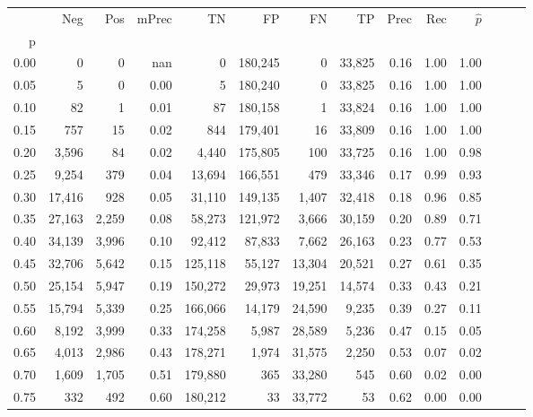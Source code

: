 \begin{tabular}{rrrrrrrrrrrrrr}
\toprule
{} &     Neg &    Pos & mPrec &       TN &       FP &      FN &      TP &  Prec &   Rec & $\hat{p}$ \\
p    &         &        &       &          &          &         &         &       &       &           \\
\midrule
0.00 &       0 &      0 &   nan &        0 &  180,245 &       0 &  33,825 &  0.16 &  1.00 &      1.00 \\
0.05 &       5 &      0 &  0.00 &        5 &  180,240 &       0 &  33,825 &  0.16 &  1.00 &      1.00 \\
0.10 &      82 &      1 &  0.01 &       87 &  180,158 &       1 &  33,824 &  0.16 &  1.00 &      1.00 \\
0.15 &     757 &     15 &  0.02 &      844 &  179,401 &      16 &  33,809 &  0.16 &  1.00 &      1.00 \\
0.20 &   3,596 &     84 &  0.02 &    4,440 &  175,805 &     100 &  33,725 &  0.16 &  1.00 &      0.98 \\
0.25 &   9,254 &    379 &  0.04 &   13,694 &  166,551 &     479 &  33,346 &  0.17 &  0.99 &      0.93 \\
0.30 &  17,416 &    928 &  0.05 &   31,110 &  149,135 &   1,407 &  32,418 &  0.18 &  0.96 &      0.85 \\
0.35 &  27,163 &  2,259 &  0.08 &   58,273 &  121,972 &   3,666 &  30,159 &  0.20 &  0.89 &      0.71 \\
0.40 &  34,139 &  3,996 &  0.10 &   92,412 &   87,833 &   7,662 &  26,163 &  0.23 &  0.77 &      0.53 \\
0.45 &  32,706 &  5,642 &  0.15 &  125,118 &   55,127 &  13,304 &  20,521 &  0.27 &  0.61 &      0.35 \\
0.50 &  25,154 &  5,947 &  0.19 &  150,272 &   29,973 &  19,251 &  14,574 &  0.33 &  0.43 &      0.21 \\
0.55 &  15,794 &  5,339 &  0.25 &  166,066 &   14,179 &  24,590 &   9,235 &  0.39 &  0.27 &      0.11 \\
0.60 &   8,192 &  3,999 &  0.33 &  174,258 &    5,987 &  28,589 &   5,236 &  0.47 &  0.15 &      0.05 \\
0.65 &   4,013 &  2,986 &  0.43 &  178,271 &    1,974 &  31,575 &   2,250 &  0.53 &  0.07 &      0.02 \\
0.70 &   1,609 &  1,705 &  0.51 &  179,880 &      365 &  33,280 &     545 &  0.60 &  0.02 &      0.00 \\
0.75 &     332 &    492 &  0.60 &  180,212 &       33 &  33,772 &      53 &  0.62 &  0.00 &      0.00 \\

\end{tabular}
